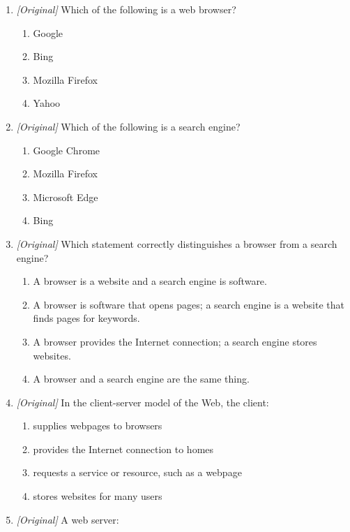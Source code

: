 \begin{enumerate}[label=\textbf{Q\arabic*.}, leftmargin=*]
\begin{enumerate}[label=\Alph*.]
    \item a computer that supplies pages to clients
  \end{enumerate}
\item \textit{[Original]} Which of the following is a web browser?
  \begin{enumerate}[label=\Alph*.]
    \item Google
    \item Bing
    \item Mozilla Firefox
    \item Yahoo
  \end{enumerate}
\item \textit{[Original]} Which of the following is a search engine?
  \begin{enumerate}[label=\Alph*.]
    \item Google Chrome
    \item Mozilla Firefox
    \item Microsoft Edge
    \item Bing
  \end{enumerate}
\item \textit{[Original]} Which statement correctly distinguishes a browser
  from a search engine?
  \begin{enumerate}[label=\Alph*.]
    \item A browser is a website and a search engine is software.
    \item A browser is software that opens pages; a search engine is a
      website that finds pages for keywords.
    \item A browser provides the Internet connection; a search engine stores
      websites.
    \item A browser and a search engine are the same thing.
  \end{enumerate}
\item \textit{[Original]} In the client-server model of the Web, the client:
  \begin{enumerate}[label=\Alph*.]
    \item supplies webpages to browsers
    \item provides the Internet connection to homes
    \item requests a service or resource, such as a webpage
    \item stores websites for many users
  \end{enumerate}
\item \textit{[Original]} A web server:
  \begin{enumerate}[label=\Alph*.]

\end{enumerate}
\end{enumerate}
